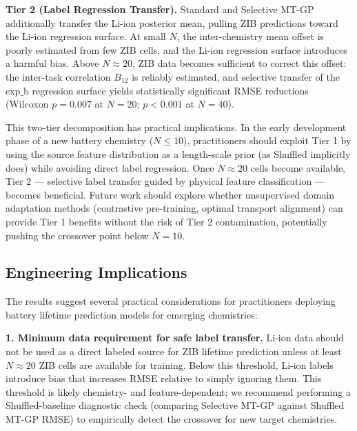 \documentclass[12pt]{article}
\begin{document}
\textbf{Tier 2 (Label Regression Transfer).} Standard and Selective MT-GP
additionally transfer the Li-ion posterior mean, pulling ZIB predictions
toward the Li-ion regression surface. At small $N$, the inter-chemistry mean
offset is poorly estimated from few ZIB cells, and the Li-ion regression surface
introduces a harmful bias. Above $N \approx 20$, ZIB data becomes sufficient to
correct this offset: the inter-task correlation $B_{12}$ is reliably estimated,
and selective transfer of the $\text{exp\_b}$ regression surface yields
statistically significant RMSE reductions (Wilcoxon $p = 0.007$ at $N = 20$;
$p < 0.001$ at $N = 40$).

This two-tier decomposition has practical implications. In the early
development phase of a new battery chemistry ($N \leq 10$), practitioners
should exploit Tier 1 by using the source feature distribution as a length-scale
prior (as Shuffled implicitly does) while avoiding direct label regression.
Once $N \approx 20$ cells become available, Tier 2 --- selective label transfer
guided by physical feature classification --- becomes beneficial.
Future work should explore whether unsupervised domain adaptation methods
\cite{pan2010transfer} (contrastive pre-training, optimal transport alignment)
can provide Tier 1 benefits without the risk of Tier 2 contamination,
potentially pushing the crossover point below $N = 10$.

\subsection{Engineering Implications}

The results suggest several practical considerations for practitioners deploying
battery lifetime prediction models for emerging chemistries:

\textbf{1. Minimum data requirement for safe label transfer.} Li-ion data
should not be used as a direct labeled source for ZIB lifetime prediction
unless at least $N \approx 20$ ZIB cells are available for training.
Below this threshold, Li-ion labels introduce bias that increases RMSE relative
to simply ignoring them. This threshold is likely chemistry- and
feature-dependent; we recommend performing a Shuffled-baseline diagnostic check
(comparing Selective MT-GP against Shuffled MT-GP RMSE) to empirically detect
the crossover for new target chemistries.
\end{document}
